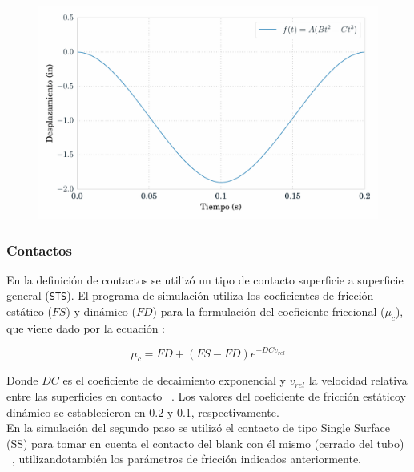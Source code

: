 \begin{figure}[!h]
\centering
\includegraphics[scale=0.6]{src/ch3/smooth_displacement_01.pdf}
\label{fig:smooth_displacement_01}
\end{figure}


\subsubsection{Contactos}

En la definición de contactos se utilizó un tipo de contacto superficie a superficie
general (\texttt{STS}). El programa de simulación utiliza los coeficientes de fricción 
estático ($FS$) y dinámico ($FD$) para la formulación del coeficiente friccional ($\mu_c$),
que viene dado por la ecuación :

\begin{equation}
\mu_c = FD + (FS - FD) e^{-DCv_{rel}}
\label{eq:frictional_coeff}
\end{equation}

Donde $DC$ es el coeficiente de decaimiento exponencial y $v_{rel}$ la velocidad relativa
entre las superficies en contacto ~\cite{lsdyna-manual}. Los valores del coeficiente de 
fricción estáticoy dinámico se establecieron en 0.2 y 0.1, respectivamente. ~\cite{carvill1993} \\

En la simulación del segundo paso se utilizó el contacto de tipo Single Surface (SS) para 
tomar en cuenta el contacto del blank con él mismo (cerrado del tubo) ~\cite{lsdyna-manual}, 
utilizandotambién los parámetros de fricción indicados anteriormente.

